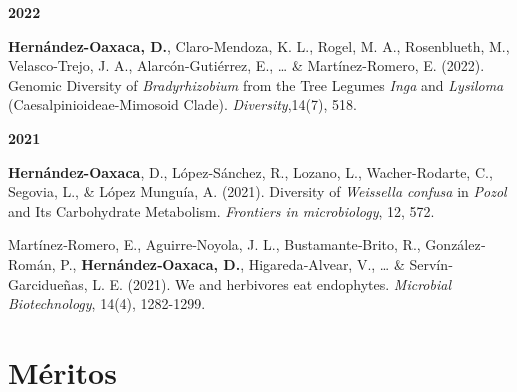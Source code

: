 \documentclass[11pt,a4paper,]{awesome-cv}
\begin{document}
\setlength{\leftskip}{0cm}

\textbf{2022}

\setlength{\leftskip}{1cm}

\textbf{Hernández-Oaxaca, D.}, Claro-Mendoza, K. L., Rogel, M. A.,
Rosenblueth, M., Velasco-Trejo, J. A., Alarcón-Gutiérrez, E., \ldots{}
\& Martínez-Romero, E. (2022). Genomic Diversity of
\emph{Bradyrhizobium} from the Tree Legumes \emph{Inga} and
\emph{Lysiloma} (Caesalpinioideae-Mimosoid Clade).
\emph{Diversity},14(7), 518.

\setlength{\leftskip}{0cm}

\textbf{2021}

\setlength{\leftskip}{1cm}

\textbf{Hernández-Oaxaca}, D., López-Sánchez, R., Lozano, L.,
Wacher-Rodarte, C., Segovia, L., \& López Munguía, A. (2021). Diversity
of \emph{Weissella confusa} in \emph{Pozol} and Its Carbohydrate
Metabolism. \emph{Frontiers in microbiology}, 12, 572.

Martínez‐Romero, E., Aguirre‐Noyola, J. L., Bustamante‐Brito, R.,
González‐Román, P., \textbf{Hernández‐Oaxaca, D.}, Higareda‐Alvear, V.,
\ldots{} \& Servín‐Garcidueñas, L. E. (2021). We and herbivores eat
endophytes. \emph{Microbial Biotechnology}, 14(4), 1282-1299.

\setlength{\leftskip}{0cm}

\hypertarget{muxe9ritos}{%
\section{Méritos}\label{muxe9ritos}}

\footnotesize

\begin{cventries}
\end{cventries}
\end{document}
